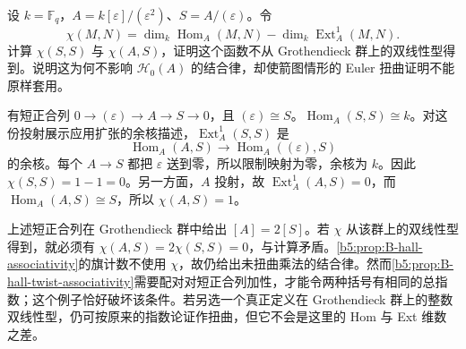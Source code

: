 \begin{exercise}\label{b5:ex:B:18}
	设 \(k=\mathbb F_q\)，\(A=k[\varepsilon]/(\varepsilon^2)\)、\(S=A/(\varepsilon)\)。令
	\[
		\chi(M,N)=\dim_k\operatorname{Hom}_A(M,N)
		-\dim_k\operatorname{Ext}^1_A(M,N).
	\]
	计算 \(\chi(S,S)\) 与 \(\chi(A,S)\)，证明这个函数不从 Grothendieck 群上的双线性型得到。说明这为何不影响 \(\mathcal H_0(A)\) 的结合律，却使箭图情形的 Euler 扭曲证明不能原样套用。
\end{exercise}
\begin{solution}
	有短正合列 \(0\to(\varepsilon)\to A\to S\to0\)，且 \((\varepsilon)\cong S\)。\(\operatorname{Hom}_A(S,S)\cong k\)。对这份投射展示应用扩张的余核描述，\(\operatorname{Ext}^1_A(S,S)\) 是
	\[
		\operatorname{Hom}_A(A,S)\longrightarrow
		\operatorname{Hom}_A((\varepsilon),S)
	\]
	的余核。每个 \(A\to S\) 都把 \(\varepsilon\) 送到零，所以限制映射为零，余核为 \(k\)。因此 \(\chi(S,S)=1-1=0\)。另一方面，\(A\) 投射，故 \(\operatorname{Ext}^1_A(A,S)=0\)，而 \(\operatorname{Hom}_A(A,S)\cong S\)，所以 \(\chi(A,S)=1\)。

	上述短正合列在 Grothendieck 群中给出 \([A]=2[S]\)。若 \(\chi\) 从该群上的双线性型得到，就必须有 \(\chi(A,S)=2\chi(S,S)=0\)，与计算矛盾。\cref{b5:prop:B-hall-associativity}的旗计数不使用 \(\chi\)，故仍给出未扭曲乘法的结合律。然而\cref{b5:prop:B-hall-twist-associativity}需要配对对短正合列加性，才能令两种括号有相同的总指数；这个例子恰好破坏该条件。若另选一个真正定义在 Grothendieck 群上的整数双线性型，仍可按原来的指数论证作扭曲，但它不会是这里的 Hom 与 Ext 维数之差。
\end{solution}

